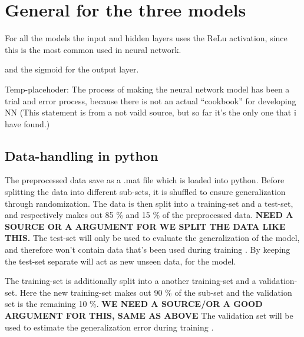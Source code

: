 
\section{General for the three models}

For all the models the input and hidden layers uses the ReLu activation, since this is the most common used in neural network. \citep{Goodfellow2016} %

and the sigmoid for the output layer.  




Temp-placehoder:
The process of making the neural network model has been a trial and error process, because there is not an actual “cookbook” for developing NN (This statement is from a not vaild source, but so far it’s the only one that i have found.)  

\subsection{Data-handling in python}
The preprocessed data save as a .mat file which is loaded into python. Before splitting the data into different sub-sets, it is shuffled to ensure generalization through randomization. The data is then split into a training-set and a test-set, and respectively makes out 85 \% and 15 \% of the preprocessed data. \textbf{NEED A SOURCE OR A ARGUMENT FOR WE SPLIT THE DATA LIKE THIS.} The test-set will only be used to evaluate the generalization of the model, and therefore won't contain data that's been used during training \citep{Duda2000}. 
By keeping the test-set separate will act as new unseen data, for the model.  

The training-set is additionally split into a another training-set and a validation-set. Here the new training-set makes out 90 \% of the sub-set and the validation set is the remaining 10 \%. \textbf{WE NEED A SOURCE/OR A GOOD ARGUMENT FOR THIS, SAME AS ABOVE} 
The validation set will be used to estimate the generalization error during training \citep{Duda2000}.  

